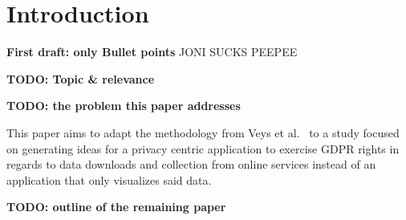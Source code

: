 \section{Introduction}
\label{intro}

\textbf{First draft: only Bullet points}
JONI SUCKS PEEPEE

\textbf{TODO: Topic \& relevance}

\textbf{TODO: the problem this paper addresses}

This paper aims to adapt the methodology from Veys et al.~\cite{Veys2021} to a study focused on generating ideas for a privacy centric application to exercise GDPR rights in regards to data downloads and collection from online services instead of an application that only visualizes said data.

\textbf{TODO: outline of the remaining paper}
